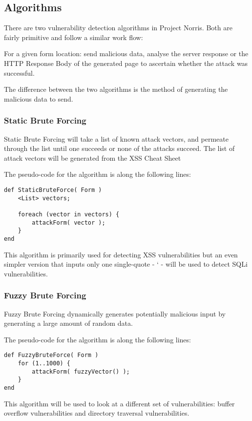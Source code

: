 \documentclass[12pt,a4paper]{article}
\begin{document}
\subsection{Algorithms}
There are two vulnerability detection algorithms in Project Norris.  Both are fairly primitive and follow a similar work flow:

For a given form location: send malicious data, analyse the server response or the HTTP Response Body of the generated page to ascertain whether the attack was successful.

The difference between the two algorithms is the method of generating the malicious data to send.

\subsubsection{Static Brute Forcing}
Static Brute Forcing will take a list of known attack vectors, and permeate through the list until one succeeds or none of the attacks succeed.  The list of attack vectors will be generated from the XSS Cheat Sheet 

The pseudo-code for the algorithm is along the following lines:

\begin{lstlisting}
def StaticBruteForce( Form )     
    <List> vectors;
    
    foreach (vector in vectors) { 
        attackForm( vector );
    }
end
\end{lstlisting}

This algorithm is primarily used for detecting XSS vulnerabilities but an even simpler version that inputs only one single-quote - ‘ - will be used to detect SQLi vulnerabilities.

\subsubsection{Fuzzy Brute Forcing}
Fuzzy Brute Forcing dynamically generates potentially malicious input by generating a large amount of random data.

The pseudo-code for the algorithm is along the following lines:

\begin{lstlisting} 
def FuzzyBruteForce( Form )
	for (1..1000) { 		
	    attackForm( fuzzyVector() ); 	
	}
end
\end{lstlisting}
This algorithm will be used to look at a different set of vulnerabilities: buffer overflow vulnerabilities and directory traversal vulnerabilities.
\end{document}
